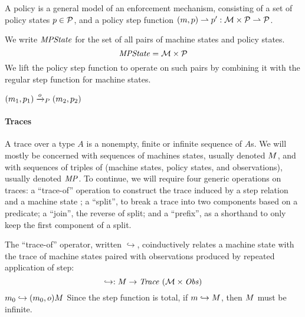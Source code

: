 \documentclass[acmsmall,review,anonymous]{acmart}\settopmatter{printfolios=true,printccs=false,printacmref=false}
\begin{document}
A policy is a general model of an enforcement mechanism, consisting of
a set of policy states \(p \in \mathcal{P}\), and a policy step function
\((m, p) \rightharpoonup p' : {\mathcal M} \times \mathcal{P}
\rightharpoonup \mathcal{P}\).

We write $\mathit{MPState}$ for the set of all pairs of machine states and policy
states.
%
\[\mathit{MPState} = {\mathcal M} \times \mathcal{P}\]
%
We lift the policy step function to operate on such pairs
by combining it with the regular step function for machine states.

            {\((m_1,p_1) \xrightarrow{o}_P (m_2,p_2)\)}



\paragraph{Traces}

A trace over a type $A$ is a nonempty, finite or infinite
sequence of $A$s. We will mostly be concerned with sequences of
machines states, usually denoted $M$, and with sequences of
triples of (machine states, policy states, and observations), usually
denoted $\mathit{MP}$.
To continue, we will require four generic operations
on traces: a ``trace-of'' operation to construct the
trace induced by a step relation and a machine state
;
a ``split'', to break a
trace into two components based on a predicate; a ``join'', the
reverse of split; and a ``prefix'', as a shorthand to only keep the
first component of a split.  

The ``trace-of'' operator, written \(\hookrightarrow\), coinductively
relates a machine state with the trace of machine states paired with
observations produced by repeated application of step:  
%
\[\hookrightarrow : M \rightarrow \mathit{Trace}~({\mathcal M} \times \mathit{Obs})\]%
%
            {\(m_0 \hookrightarrow (m_0,o) M\)}%
%
\noindent
Since the step function is total, if \(m \hookrightarrow M\),
then \(M\) must be infinite.
\end{document}
